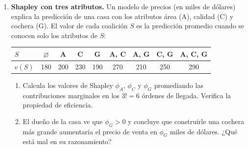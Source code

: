 \documentclass[11pt]{article}
\newcommand{\espacio}[1]{\par\vspace{#1}}
\begin{document}
\begin{enumerate}
\begin{enumerate}
  \item ¿Qué error ponderado tiene el mismo tocón $h_1$ con los pesos nuevos? ¿Qué consecuencia tiene para la ronda 2?
  \espacio{2.2cm}
\end{enumerate}

\item \textbf{Shapley con tres atributos.} Un modelo de precios (en miles de dólares) explica la predicción de una casa con los atributos área (A), calidad (C) y cochera (G). El valor de cada coalición $S$ es la predicción promedio cuando se conocen solo los atributos de $S$:
\begin{center}
\begin{tabular}{l|cccccccc}
$S$ & $\varnothing$ & A & C & G & A, C & A, G & C, G & A, C, G \\ \hline
$v(S)$ & 180 & 200 & 230 & 190 & 270 & 210 & 250 & 290
\end{tabular}
\end{center}
\begin{enumerate}
  \item Calcula los valores de Shapley $\phi_A$, $\phi_C$ y $\phi_G$ promediando las contribuciones marginales en los $3! = 6$ órdenes de llegada. Verifica la propiedad de eficiencia.
  \espacio{5cm}

  \item El dueño de la casa ve que $\phi_G > 0$ y concluye que construirle una cochera más grande aumentaría el precio de venta en $\phi_G$ miles de dólares. ¿Qué está mal en su razonamiento?
  \espacio{2.5cm}
\end{enumerate}

\end{enumerate}
\end{document}
